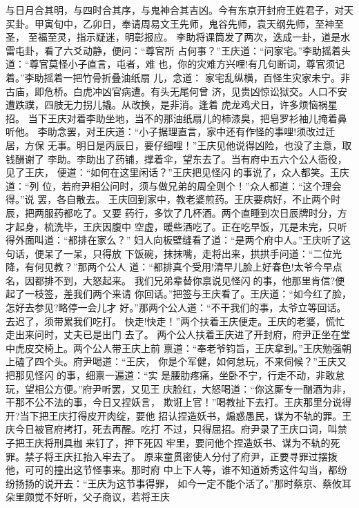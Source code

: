 与日月合其明，与四时合其序，与鬼神合其吉凶。今有东京开封府王姓君子，对天
买卦。甲寅旬中，乙卯日，奉请周易文王先师，鬼谷先师，袁天纲先师，至神至圣，
至福至灵，指示疑迷，明彰报应。
李助将课筒发了两次，迭成一卦，道是水雷屯卦，看了六爻动静，便问：“尊官所
占何事？”王庆道：“问家宅。”李助摇着头道：“尊官莫怪小子直言，屯者，难
也，你的灾难方兴哩!有几句断词，尊官须记着。”李助摇着一把竹骨折叠油纸扇
儿，念道：
家宅乱纵横，百怪生灾家未宁。非古庙，即危桥。白虎冲凶官病遭。有头无尾何曾
济，见贵凶惊讼狱交。人口不安遭跌蹼，四肢无力拐儿撬。从改换，是非消。逢着
虎龙鸡犬日，许多烦恼祸星招。
当下王庆对着李助坐地，当不的那油纸扇儿的柿漆臭，把皂罗衫袖儿掩着鼻听他。
李助念罢，对王庆道：“小子据理直言，家中还有作怪的事哩!须改过迁居，方保
无事。明日是丙辰日，要仔细哩！”王庆见他说得凶险，也没了主意，取钱酬谢了
李助。李助出了药铺，撑着伞，望东去了。当有府中五六个公人衙役，见了王庆，
便道：“如何在这里闲话？”王庆把见怪闪的事说了，众人都笑。王庆道：“列
位，若府尹相公问时，须与做兄弟的周全则个！”众人都道：“这个理会得。”说
罢，各自散去。
王庆回到家中，教老婆煎药。王庆要病好，不止两个时辰，把两服药都吃了。又要
药行，多饮了几杯酒。两个直睡到次日辰牌时分，方才起身，梳洗毕，王庆因腹中
空虚，暖些酒吃了。正在吃早饭，兀是未完，只听得外面叫道：“都排在家么？”
妇人向板壁缝看了道：“是两个府中人。”王庆听了这句话，便呆了一呆，只得放
下饭碗，抹抹嘴，走将出来，拱拱手问道：“二位光降，有何见教？”那两个公人
道：“都排真个受用!清早儿脸上好春色!太爷今早点名，因都排不到，大怒起来。
我们兄弟辈替你禀说见怪闪的事，他那里肯信?便起了一枝签，差我们两个来请
你回话。”把签与王庆看了。王庆道：“如今红了脸，怎好去参见?略停一会儿才
好。”那两个公人道：“不干我们的事，太爷立等回话。去迟了，须带累我们吃打。
快走!快走！”两个扶着王庆便走。王庆的老婆，慌忙走出来问时，丈夫已是出门
去了。
两个公人扶着王庆进了开封府，府尹正坐在堂中虎皮交椅上。两个公人带王庆上前
禀道：“奉老爷钧旨，王庆拿到。”王庆勉强朝上磕了四个头。府尹喝道：“王庆，
你是个军健，如何怠玩，不来伺候？”王庆又把那见怪闪的事，细禀一遍道：“实
是腰肋疼痛，坐卧不宁，行走不动，非敢怠玩，望相公方便。”府尹听罢，又见王
庆脸红，大怒喝道：“你这厮专一酗酒为非，干那不公不法的事，今日又捏妖言，
欺诳上官！”喝教扯下去打。王庆那里分说得开?当下把王庆打得皮开肉绽，要他
招认捏造妖书，煽惑愚民，谋为不轨的罪。王庆今日被官府拷打，死去再醒。吃打
不过，只得屈招。府尹录了王庆口词，叫禁子把王庆将刑具枷来钉了，押下死囚
牢里，要问他个捏造妖书、谋为不轨的死罪。禁子将王庆扛抬入牢去了。
原来童贯密使人分付了府尹，正要寻罪过摆拨他，可可的撞出这节怪事来。那时府
中上下人等，谁不知道娇秀这件勾当，都纷纷扬扬的说开去：“王庆为这节事得罪，
如今一定不能个活了。”那时蔡京、蔡攸耳朵里颇觉不好听，父子商议，若将王庆
